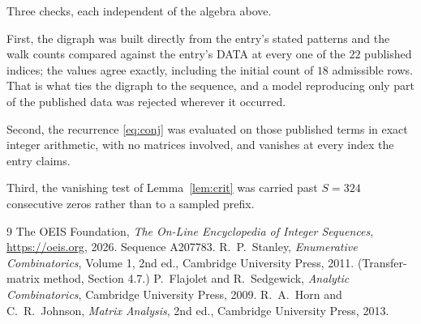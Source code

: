 \documentclass[11pt,a4paper]{article}
\theoremstyle{plain}
\theoremstyle{definition}
\begin{document}
Three checks, each independent of the algebra above.

First, the digraph was built directly from the entry's stated patterns and the walk counts
compared against the entry's DATA at every one of the $22$ published indices; the
values agree exactly, including the initial count of $18$ admissible rows. That is
what ties the digraph to the sequence, and a model reproducing only part of the published
data was rejected wherever it occurred.

Second, the recurrence \eqref{eq:conj} was evaluated on those published terms in exact
integer arithmetic, with no matrices involved, and vanishes at every index the entry claims.

Third, the vanishing test of Lemma~\ref{lem:crit} was carried past $S=324$ consecutive
zeros rather than to a sampled prefix.

\begin{thebibliography}{9}
 The OEIS Foundation, \emph{The On-Line Encyclopedia of Integer
Sequences}, \url{https://oeis.org}, 2026. Sequence A207783.
 R.~P.~Stanley, \emph{Enumerative Combinatorics}, Volume 1, 2nd ed.,
Cambridge University Press, 2011. (Transfer-matrix method, Section 4.7.)
 P.~Flajolet and R.~Sedgewick, \emph{Analytic Combinatorics}, Cambridge
University Press, 2009.
 R.~A.~Horn and C.~R.~Johnson, \emph{Matrix Analysis}, 2nd ed., Cambridge
University Press, 2013.
\end{thebibliography}
\end{document}
